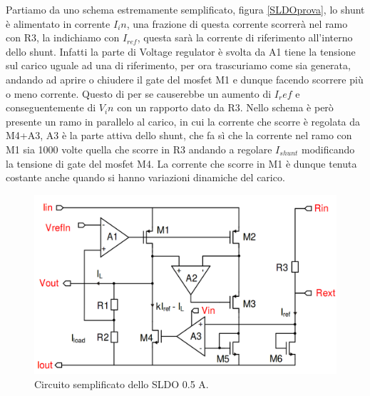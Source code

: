 Partiamo da uno schema estremamente semplificato, figura \ref{SLDOprova}, lo shunt è alimentato in corrente $I_in$, una frazione di questa corrente scorrerà nel ramo con R3, la indichiamo con $I_{ref}$, questa sarà la corrente di riferimento all'interno dello shunt. 
Infatti la parte di Voltage regulator è svolta da A1 tiene la tensione sul carico uguale ad una di riferimento, per ora trascuriamo come sia generata, andando ad aprire o chiudere il gate del mosfet M1 e dunque facendo scorrere più o meno corrente. 
Questo di per se causerebbe un aumento di $I_ref$ e conseguentemente di $V_in$ con un rapporto dato da R3. Nello schema è però presente un ramo in parallelo al carico, in cui la corrente che scorre è regolata da M4+A3, A3 è la parte attiva dello shunt, che fa sì che la corrente nel ramo con M1 sia 1000 volte quella che scorre in R3 andando a regolare $I_{shunt}$ modificando la tensione di gate del mosfet M4. 
La corrente che scorre in M1 è dunque tenuta costante anche quando si hanno variazioni dinamiche del carico.

\begin{figure}
\centering
\includegraphics[scale=.3]{Immagini/SLDO5A}
\caption{Circuito semplificato dello SLDO 0.5 A.}
\label{SLDO5A}
\end{figure}

